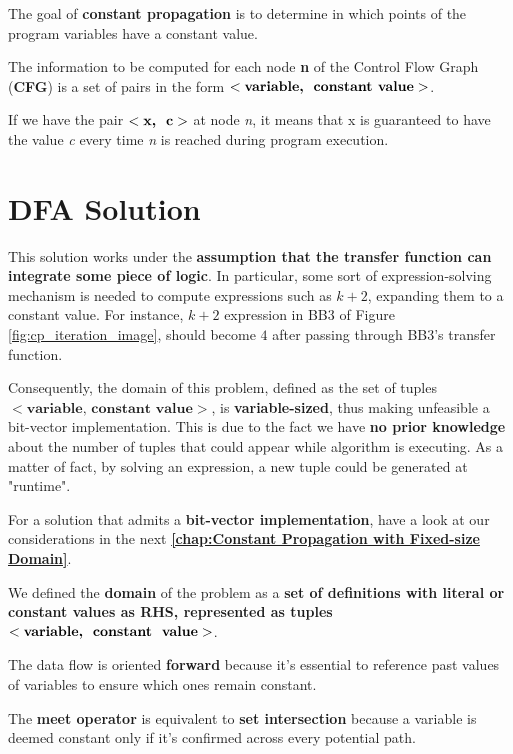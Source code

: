 \documentclass[a4paper,12pt,numbers=noenddot]{scrreprt}
\begin{document}
        The goal of \textbf{constant propagation} is to determine in which points of the program variables have a constant value.
        
        The information to be computed for each node \textbf{n} of the Control Flow Graph (\textbf{CFG}) is a set of pairs in the form $<\textbf{variable,\; constant value}>$.
        
        If we have the pair $<\textbf{x,\; c}>$ at node \textit{n}, it means that x is guaranteed to have the value \textit{c} every time \textit{n} is reached during program execution.

    
    \section*{DFA Solution}

        This solution works under the \textbf{assumption that the transfer function can integrate some piece of logic}. In particular, some sort of expression-solving mechanism is needed to compute expressions such as $k+2$, expanding them to a constant value. For instance, $k+2$ expression in BB3 of Figure \ref{fig:cp_iteration_image}, should become $4$ after passing through BB3's transfer function.

        Consequently, the domain of this problem, defined as the set of tuples $<\textbf{variable, constant value}>$, is \textbf{variable-sized}, thus making unfeasible a bit-vector implementation. This is due to the fact we have \textbf{no prior knowledge} about the number of tuples that could appear while algorithm is executing.
        As a matter of fact, by solving an expression, a new tuple could be generated at "runtime".

        For a solution that admits a \textbf{bit-vector implementation}, have a look at our considerations in the next \textbf{\autoref{chap:Constant Propagation with Fixed-size Domain}}.
        
        We defined the \textbf{domain} of the problem as a \textbf{set of definitions with literal or constant values as RHS, represented as tuples} $<\textbf{variable, \;constant \;value}>$.
        
        The data flow is oriented \textbf{forward} because it's essential to reference past values of variables to ensure which ones remain constant.
        
        The \textbf{meet operator} is equivalent to \textbf{set intersection} because a variable is deemed constant only if it's confirmed across every potential path.
        
\end{document}
